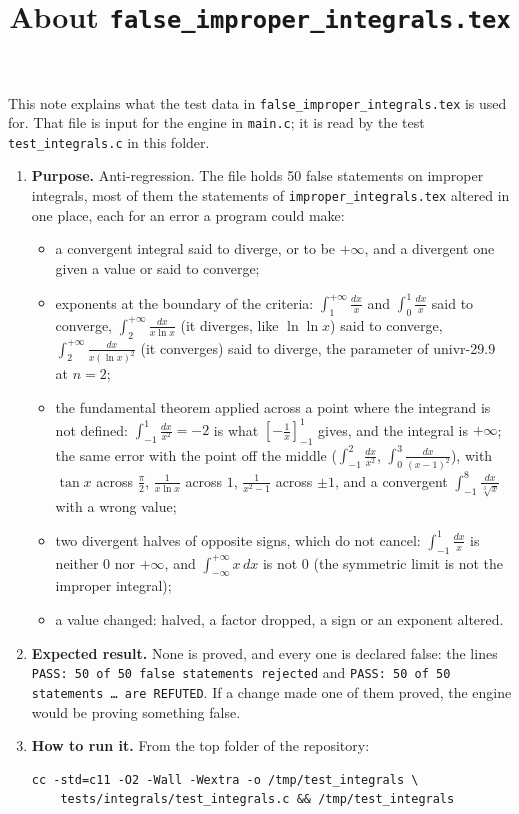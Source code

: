 \documentclass[11pt,a4paper]{article}
\title{About \texttt{false\_improper\_integrals.tex}}
\author{}
\date{}
\begin{document}
\maketitle
This note explains what the test data in \texttt{false\_improper\_integrals.tex} is used for. That file is input for the engine in \texttt{main.c}; it is read by the test \texttt{test\_integrals.c} in this folder.

\begin{enumerate}
\item \textbf{Purpose.} Anti-regression. The file holds 50 false statements on improper integrals, most of them the statements of \texttt{improper\_integrals.tex} altered in one place, each for an error a program could make:
\begin{itemize}
\item a convergent integral said to diverge, or to be $+\infty$, and a divergent one given a value or said to converge;
\item exponents at the boundary of the criteria: $\int_{1}^{+\infty} \frac{dx}{x}$ and $\int_{0}^{1} \frac{dx}{x}$ said to converge, $\int_{2}^{+\infty} \frac{dx}{x \ln x}$ (it diverges, like $\ln \ln x$) said to converge, $\int_{2}^{+\infty} \frac{dx}{x (\ln x)^{2}}$ (it converges) said to diverge, the parameter of univr-29.9 at $n = 2$;
\item the fundamental theorem applied across a point where the integrand is not defined: $\int_{-1}^{1} \frac{dx}{x^{2}} = -2$ is what $\left[-\frac{1}{x}\right]_{-1}^{1}$ gives, and the integral is $+\infty$; the same error with the point off the middle ($\int_{-1}^{2} \frac{dx}{x^{2}}$, $\int_{0}^{3} \frac{dx}{(x - 1)^{2}}$), with $\tan x$ across $\frac{\pi}{2}$, $\frac{1}{x \ln x}$ across $1$, $\frac{1}{x^{2} - 1}$ across $\pm 1$, and a convergent $\int_{-1}^{8} \frac{dx}{\sqrt[3]{x}}$ with a wrong value;
\item two divergent halves of opposite signs, which do not cancel: $\int_{-1}^{1} \frac{dx}{x}$ is neither $0$ nor $+\infty$, and $\int_{-\infty}^{+\infty} x \, dx$ is not $0$ (the symmetric limit is not the improper integral);
\item a value changed: halved, a factor dropped, a sign or an exponent altered.
\end{itemize}

\item \textbf{Expected result.} None is proved, and every one is declared false: the lines \texttt{PASS: 50 of 50 false statements rejected} and \texttt{PASS: 50 of 50 statements \dots{} are REFUTED}. If a change made one of them proved, the engine would be proving something false.

\item \textbf{How to run it.} From the top folder of the repository:
\begin{verbatim}
cc -std=c11 -O2 -Wall -Wextra -o /tmp/test_integrals \
    tests/integrals/test_integrals.c && /tmp/test_integrals
\end{verbatim}
\end{enumerate}
\end{document}
